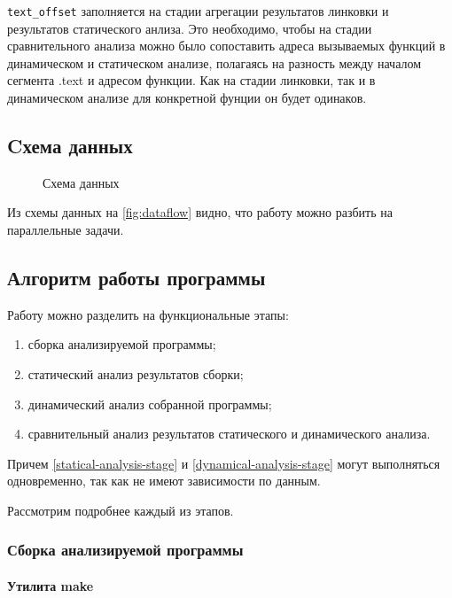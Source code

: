 \texttt{text\_offset} заполняется на стадии агрегации результатов линковки и результатов статического анлиза.
Это необходимо, чтобы на стадии сравнительного анализа можно было сопоставить адреса вызываемых функций в динамическом
и статическом анализе, полагаясь на разность между началом сегмента .text и адресом функции. Как на стадии линковки, так
и в динамическом анализе для конкретной фунции он будет одинаков.


\subsection{Cхема данных}\label{sec:ch2/sec2/sub2}

\begin{figure}[!htbp]
    \centerfloat{
        
    }
    \caption{Схема данных {\ProgModule}\label{fig:dataflow}}
\end{figure}
Из схемы данных на \autoref{fig:dataflow} видно, что работу {\ProgModule} можно разбить на параллельные 
задачи.


\subsection{Алгоритм работы программы}\label{sec:ch2/sec2/sub3}
Работу {\ProgModule} можно разделить на функциональные этапы:
\begin{enumerate}[label={\arabic*)}]
    \item сборка анализируемой программы;
    \item статический анализ результатов сборки\label{statical-analysis-stage};
    \item динамический анализ собранной программы\label{dynamical-analysis-stage};
    \item сравнительный анализ результатов статического и динамического анализа.
\end{enumerate}

Причем \autoref{statical-analysis-stage} и \autoref{dynamical-analysis-stage} могут выполняться
одновременно, так как не имеют зависимости по данным.

Рассмотрим подробнее каждый из этапов.
\subsubsection{Сборка анализируемой программы}\label{sec:ch2/sec2/sub3/sub1}

\paragraph{Утилита make}\label{sec:ch2/sec2/sub3/sub1/par1}\mbox{}

